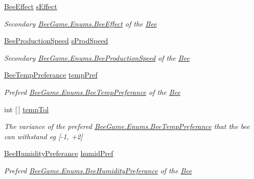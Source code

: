 \begin{DoxyCompactItemize}
\hyperlink{namespace_bee_game_1_1_enums_acf7ae32a86385a40fc0c7b55af95c6c3}{Bee\+Effect} \hyperlink{struct_bee_game_1_1_bee_1_1_bee_data_ac65b550d77e529a62cb60acf86502bc2}{s\+Effect}
\begin{DoxyCompactList}\small\item\em Secondary \hyperlink{namespace_bee_game_1_1_enums_acf7ae32a86385a40fc0c7b55af95c6c3}{Bee\+Game.\+Enums.\+Bee\+Effect} of the \hyperlink{namespace_bee_game_1_1_bee}{Bee} \end{DoxyCompactList}\item 
\hyperlink{namespace_bee_game_1_1_enums_afee18200a21cc4b8e1d0cdb669930f14}{Bee\+Production\+Speed} \hyperlink{struct_bee_game_1_1_bee_1_1_bee_data_af2e94ee206fd06b8314888f8ba3d56e9}{s\+Prod\+Speed}
\begin{DoxyCompactList}\small\item\em Secondary \hyperlink{namespace_bee_game_1_1_enums_afee18200a21cc4b8e1d0cdb669930f14}{Bee\+Game.\+Enums.\+Bee\+Production\+Speed} of the \hyperlink{namespace_bee_game_1_1_bee}{Bee} \end{DoxyCompactList}\item 
\hyperlink{namespace_bee_game_1_1_enums_a9db0f9ac859fab168654d657f248b024}{Bee\+Temp\+Preferance} \hyperlink{struct_bee_game_1_1_bee_1_1_bee_data_ab7c3b5184d04319359a7f31fa0a4dc8c}{temp\+Pref}
\begin{DoxyCompactList}\small\item\em Preferd \hyperlink{namespace_bee_game_1_1_enums_a9db0f9ac859fab168654d657f248b024}{Bee\+Game.\+Enums.\+Bee\+Temp\+Preferance} of the \hyperlink{namespace_bee_game_1_1_bee}{Bee} \end{DoxyCompactList}\item 
int \mbox{[}$\,$\mbox{]} \hyperlink{struct_bee_game_1_1_bee_1_1_bee_data_aa333655c6249bb86cba999dcdf45c614}{temp\+Tol}
\begin{DoxyCompactList}\small\item\em The variance of the prefered \hyperlink{namespace_bee_game_1_1_enums_a9db0f9ac859fab168654d657f248b024}{Bee\+Game.\+Enums.\+Bee\+Temp\+Preferance} that the bee can withstand eg \mbox{[}-\/1, +2\mbox{]} \end{DoxyCompactList}\item 
\hyperlink{namespace_bee_game_1_1_enums_a66566cbc9da8d1d1e402156b4bd3bf9d}{Bee\+Humidity\+Preferance} \hyperlink{struct_bee_game_1_1_bee_1_1_bee_data_a6b786e9cb8f5bbf7b6d1a16d7c7eb37e}{humid\+Pref}
\begin{DoxyCompactList}\small\item\em Preferd \hyperlink{namespace_bee_game_1_1_enums_a66566cbc9da8d1d1e402156b4bd3bf9d}{Bee\+Game.\+Enums.\+Bee\+Humidity\+Preferance} of the \hyperlink{namespace_bee_game_1_1_bee}{Bee} \end{DoxyCompactList}\item 

\end{DoxyCompactItemize}
